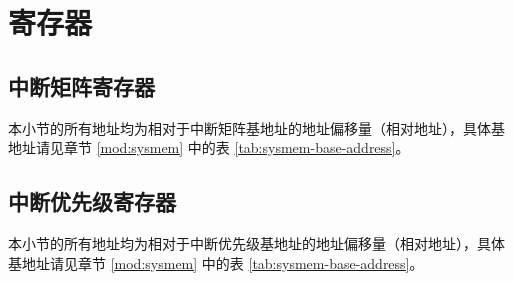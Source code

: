 \documentclass[main\_\_CN.tex]{subfiles}
\begin{document}


\clearpage
\section{寄存器}

\subsection{中断矩阵寄存器}

本小节的所有地址均为相对于中断矩阵基地址的地址偏移量（相对地址），具体基地址请见章节 \ref{mod:sysmem} \textit{} 中的表 \ref{tab:sysmem-base-address}。



\subsection{中断优先级寄存器}
\label{sec:intpri-reg}

本小节的所有地址均为相对于中断优先级基地址的地址偏移量（相对地址），具体基地址请见章节 \ref{mod:sysmem} \textit{} 中的表 \ref{tab:sysmem-base-address}。


\end{document}
